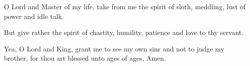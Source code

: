 \begin{priest}
\item O Lord and Master of my life,
    take from me the spirit of sloth, meddling, lust of power and idle talk.
\item But give rather the spirit of chastity, humility,
    patience and love to thy servant.
\item Yea, O Lord and King, grant me to see my own sins and not to judge my brother,
    for thou art blessed unto ages of ages, Amen.
\end{priest}